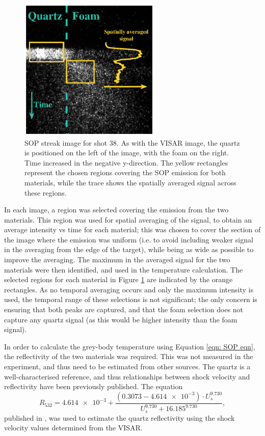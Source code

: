 \begin{figure} [h]
\begin{centering}
\includegraphics[width=0.6\textwidth]{figures/Experiment/SOPImage.eps}%
\caption{\label{fig:SOP data} SOP streak image for shot 38. As with the VISAR image, the quartz is positioned on the left of the image, with the foam on the right. Time increased in the negative y-direction. The yellow rectangles represent the chosen regions covering the SOP emission for both materials, while the trace shows the spatially averaged signal across these regions.}
\end{centering}
\end{figure}

In each image, a region was selected covering the emission from the two materials. This region was used for spatial averaging of the signal, to obtain an average intensity vs time for each material; this was chosen to cover the section of the image where the emission was uniform (i.e. to avoid including weaker signal in the averaging from the edge of the target), while being as wide as possible to improve the averaging. The maximum in the averaged signal for the two materials were then identified, and used in the temperature calculation. The selected regions for each material in Figure \ref{fig:SOP data} are indicated by the orange rectangles. As no temporal averaging occurs and only the maximum intensity is used, the temporal range of these selections is not significant; the only concern is ensuring that both peaks are captured, and that the foam selection does not capture any quartz signal (as this would be higher intensity than the foam signal).

In order to calculate the grey-body temperature using Equation \ref{eqn: SOP eqn}, the reflectivity of the two materials was required. This was not measured in the experiment, and thus need to be estimated from other sources. The quartz is a well-characterised reference, and thus relationships between shock velocity and reflectivity have been previously published. The equation \begin{equation} \label{eqn:QuartzR} R_{532} = \num{4.614e-3} + \frac{ (0.3073 - \num{4.614e-3})\cdot U_s^{9.730}}{U_s^{9.730} + 16.185^{9.730}}, \end{equation} published in \cite{Millot2015}, was used to estimate the quartz reflectivity using the shock velocity values determined from the VISAR.

